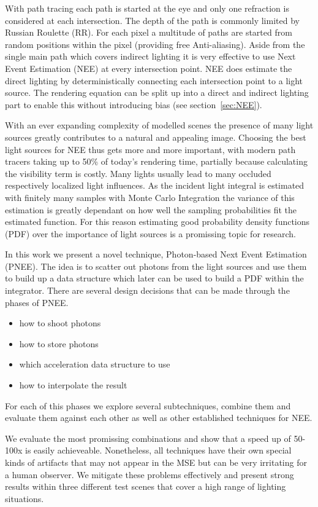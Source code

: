 With path tracing each path is started at the eye and only one refraction is considered at each intersection. The depth of the path is commonly limited by Russian Roulette (RR). For each pixel a multitude of paths are started from random positions within the pixel (providing free Anti-aliasing). Aside from the single main path which covers indirect lighting it is very effective to use Next Event Estimation (NEE) at every intersection point. NEE does estimate the direct lighting by deterministically connecting each intersection point to a light source. The rendering equation can be split up into a direct and indirect lighting part to enable this without introducing bias (see section~\ref{sec:NEE}).

With an ever expanding complexity of modelled scenes the presence of many light sources greatly contributes to a natural and appealing image. Choosing the best light sources for NEE thus gets more and more important, with modern path tracers taking up to 50\% of today's rendering time, partially because calculating the visibility term is costly. Many lights usually lead to many occluded respectively localized light influences. As the incident light integral is estimated with finitely many samples with Monte Carlo Integration the variance of this estimation is greatly dependant on how well the sampling probabilities fit the estimated function. For this reason estimating good probability density functions (PDF) over the importance of light sources is a promissing topic for research.

In this work we present a novel technique, Photon-based Next Event Estimation (PNEE). The idea is to scatter out photons from the light sources and use them to build up a data structure which later can be used to build a PDF within the integrator. There are several design decisions that can be made through the phases of PNEE.

\begin{itemize}
    \item how to shoot photons
    \item how to store photons
    \item which acceleration data structure to use
    \item how to interpolate the result
\end{itemize}

For each of this phases we explore several subtechniques, combine them and evaluate them against each other as well as other established techniques for NEE.

We evaluate the most promissing combinations and show that a speed up of 50-100x is easily achieveable. Nonetheless, all techniques have their own special kinds of artifacts that may not appear in the MSE but can be very irritating for a human observer. We mitigate these problems effectively and present strong results within three different test scenes that cover a high range of lighting situations.

